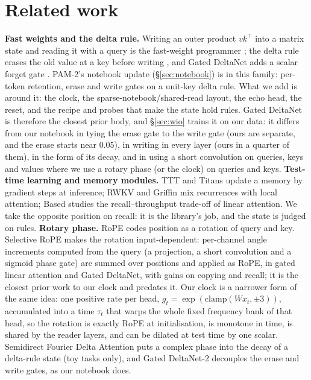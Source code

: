 \documentclass[11pt]{article}
\newcommand{\arch}{PAM-2}
\begin{document}
\section{Related work}
\label{sec:related}
\textbf{Fast weights and the delta rule.} Writing an outer product $v k^\top$ into a matrix state and reading it with a query is the fast-weight programmer \citep{schlag2021linear,katharopoulos2020transformers}; the delta rule erases the old value at a key before writing \citep{yang2024parallelizing}, and Gated DeltaNet adds a scalar forget gate \citep{yang2024gated}. \arch's notebook update (\S\ref{sec:notebook}) is in this family: per-token retention, erase and write gates on a unit-key delta rule. What we add is around it: the clock, the sparse-notebook/shared-read layout, the echo head, the reset, and the recipe and probes that make the state hold rules. Gated DeltaNet is therefore the closest prior body, and \S\ref{sec:wio} trains it on our data: it differs from our notebook in tying the erase gate to the write gate (ours are separate, and the erase starts near 0.05), in writing in every layer (ours in a quarter of them), in the form of its decay, and in using a short convolution on queries, keys and values where we use a rotary phase (or the clock) on queries and keys.
\textbf{Test-time learning and memory modules.} TTT \citep{sun2024ttt} and Titans \citep{behrouz2024titans} update a memory by gradient steps at inference; RWKV \citep{peng2023rwkv} and Griffin \citep{de2024griffin} mix recurrences with local attention; Based \citep{arora2024based} studies the recall--throughput trade-off of linear attention. We take the opposite position on recall: it is the library's job, and the state is judged on rules.
\textbf{Rotary phase.} RoPE \citep{su2024roformer} codes position as a rotation of query and key. Selective RoPE \citep{movahedi2026selective} makes the rotation input-dependent: per-channel angle increments computed from the query (a projection, a short convolution and a sigmoid phase gate) are summed over positions and applied as RoPE, in gated linear attention and Gated DeltaNet, with gains on copying and recall; it is the closest prior work to our clock and predates it. Our clock is a narrower form of the same idea: one positive rate per head, $g_t=\exp(\mathrm{clamp}(W x_t,\pm3))$, accumulated into a time $\tau_t$ that warps the whole fixed frequency bank of that head, so the rotation is exactly RoPE at initialisation, is monotone in time, is shared by the reader layers, and can be dilated at test time by one scalar. Semidirect Fourier Delta Attention \citep{zhang2026sfda} puts a complex phase into the decay of a delta-rule state (toy tasks only), and Gated DeltaNet-2 \citep{hatamizadeh2026gdn2} decouples the erase and write gates, as our notebook does.
\end{document}
